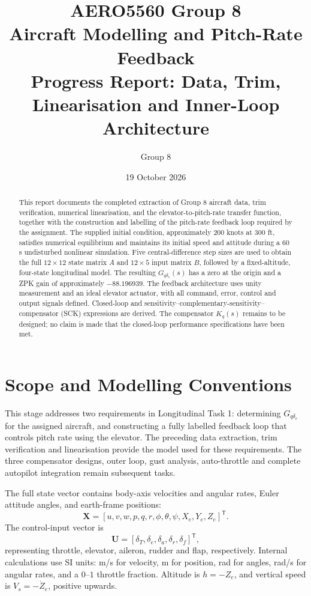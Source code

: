 \documentclass[a4paper,11pt]{article}
\title{AERO5560 Group 8\\Aircraft Modelling and Pitch-Rate Feedback\\\large Progress Report: Data, Trim, Linearisation and Inner-Loop Architecture}
\author{Group 8}
\date{19 October 2026}
\newcommand{\de}{\delta_e}
\newcommand{\dt}{\delta_T}
\newcommand{\Gq}{G_{q\delta_e}}
\begin{document}
\maketitle
\begin{abstract}
This report documents the completed extraction of Group 8 aircraft data, trim verification, numerical linearisation, and the elevator-to-pitch-rate transfer function, together with the construction and labelling of the pitch-rate feedback loop required by the assignment. The supplied initial condition, approximately 200 knots at 300 ft, satisfies numerical equilibrium and maintains its initial speed and attitude during a 60 s undisturbed nonlinear simulation. Five central-difference step sizes are used to obtain the full $12\times12$ state matrix $A$ and $12\times5$ input matrix $B$, followed by a fixed-altitude, four-state longitudinal model. The resulting $\Gq(s)$ has a zero at the origin and a ZPK gain of approximately $-88.196939$. The feedback architecture uses unity measurement and an ideal elevator actuator, with all command, error, control and output signals defined. Closed-loop and sensitivity--complementary-sensitivity--compensator (SCK) expressions are derived. The compensator $K_q(s)$ remains to be designed; no claim is made that the closed-loop performance specifications have been met.
\end{abstract}
\clearpage
\tableofcontents
\clearpage

\section{Scope and Modelling Conventions}
This stage addresses two requirements in Longitudinal Task 1: determining $\Gq$ for the assigned aircraft, and constructing a fully labelled feedback loop that controls pitch rate using the elevator. The preceding data extraction, trim verification and linearisation provide the model used for these requirements. The three compensator designs, outer loop, gust analysis, auto-throttle and complete autopilot integration remain subsequent tasks.

The full state vector contains body-axis velocities and angular rates, Euler attitude angles, and earth-frame positions:
\begin{equation}
\bm X=[u,v,w,p,q,r,\phi,\theta,\psi,X_e,Y_e,Z_e]^{\mathsf T}.
\end{equation}
The control-input vector is
\begin{equation}
\bm U=[\dt,\de,\delta_a,\delta_r,\delta_f]^{\mathsf T},
\end{equation}
representing throttle, elevator, aileron, rudder and flap, respectively. Internal calculations use SI units: m/s for velocity, m for position, rad for angles, rad/s for angular rates, and a $0$--$1$ throttle fraction. Altitude is $h=-Z_e$, and vertical speed is $V_s=-\dot Z_e$, positive upwards.
\end{document}
